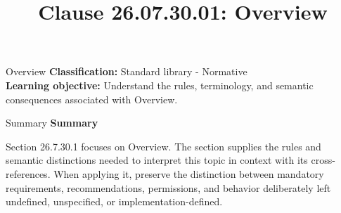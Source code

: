 \documentclass[10pt,letterpaper]{article}
\title{Clause 26.07.30.01: Overview}
\author{}
\date{}
\begin{document}
\maketitle
\begin{CornellOverviewBox}{Overview}
\textbf{Classification:} Standard library - Normative\\[2pt]
\textbf{Learning objective:} Understand the rules, terminology, and semantic consequences associated with Overview.
\end{CornellOverviewBox}\begin{CornellSummaryBox}{Summary}
{\sffamily\bfseries\color{Accent} Summary}\par\vspace{3pt}Section 26.7.30.1 focuses on Overview. The section supplies the rules and semantic distinctions needed to interpret this topic in context with its cross-references. When applying it, preserve the distinction between mandatory requirements, recommendations, permissions, and behavior deliberately left undefined, unspecified, or implementation-defined.
\end{CornellSummaryBox}
\end{document}
